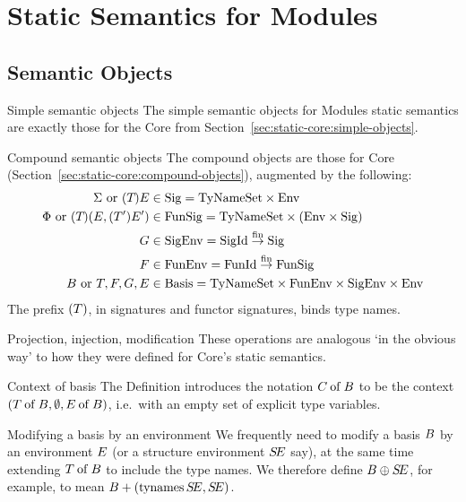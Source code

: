 \chapter{Static Semantics for Modules}

\section{Semantic Objects}

\begin{clause}{Simple semantic objects}
The simple semantic objects for Modules static semantics are exactly
those for the Core from Section~\ref{sec:static-core:simple-objects}.
\end{clause}

\begin{definition}{Compound semantic objects}
The compound objects are those for Core (Section~\ref{sec:static-core:compound-objects}),
augmented by the following:
\begin{align*}
\Sigma\ {\rm or}\ (T_{})E_{}
                & \in    {\rm Sig} =  {\rm TyNameSet}\times{\rm Env} \\
\Phi\ {\rm or}\ (T_{})(E_{},(T_{}')E_{}')
                & \in    {\rm FunSig} = {\rm TyNameSet}\times
                                         ({\rm Env}\times{\rm Sig})\\
G              & \in    {\rm SigEnv}        =       {\rm SigId}\stackrel{{\rm fin}}{\to}{\rm Sig} \\
F              & \in    {\rm FunEnv}        =       {\rm FunId}\stackrel{{\rm fin}}{\to}{\rm FunSig} \\
B\ {\rm or}\ T,F,G,E
                & \in    {\rm Basis} = {\rm TyNameSet}\times
                                              {\rm FunEnv}\times{\rm SigEnv}\times{\rm Env}
\end{align*}
The 
prefix $(T)$, in signatures and functor signatures, binds  type names.
\end{definition}

\begin{clause}{Projection, injection, modification}
These operations are analogous `in the obvious way' to how they were
defined for Core's static semantics.
\end{clause}

\begin{definition}{Context of basis}
The Definition introduces the notation $C \mathbin{\rm of} B$ to be the context
$(T \mathbin{\rm of} B,\emptyset,E \mathbin{\rm of} B)$, i.e.~with an empty set of
explicit type variables.
\end{definition}

\begin{definition}{Modifying a basis by an environment}
We frequently need to modify a basis $B$ by an environment $E$
(or a structure environment $\mbox{$S\!E$}$ say),
at the same time extending $T \mathbin{\rm of} B$ to include the type names.
We therefore define $B\oplus\mbox{$S\!E$}$, for example, to mean
$B+(\mathop{\rm tynames}\nolimits\mbox{$S\!E$},\mbox{$S\!E$})$.
\end{definition}

